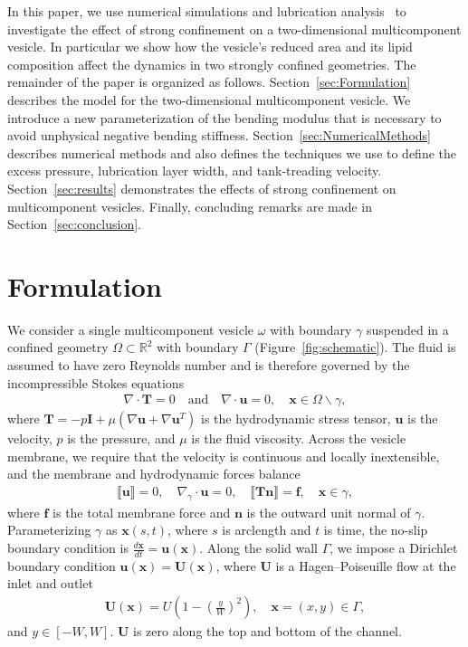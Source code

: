 \documentclass[twoside,twocolumn,9pt]{article}
\newcommand{\ff}{\mathbf{f}}
\newcommand{\nn}{\mathbf{n}}
\newcommand{\RR}{\mathbb{R}}
\newcommand{\uu}{\mathbf{u}}
\newcommand{\TT}{\mathbf{T}}
\newcommand{\UU}{\mathbf{U}}
\newcommand{\xx}{\mathbf{x}}
\begin{document}
In this paper, we use numerical simulations and lubrication
analysis~\cite{YoungStone2017_PRF,
mis-wis-ber-key-li-tun-law-per-erd-zha-zha-sun-kal-lam-kon2019} to
investigate the effect of strong confinement on a two-dimensional
multicomponent vesicle. In particular we show how the vesicle's reduced
area and its lipid composition affect the dynamics in two strongly
confined geometries.
%
The remainder of the paper is organized as follows.
Section~\ref{sec:Formulation} describes the model for the
two-dimensional multicomponent vesicle. We introduce a new
parameterization of the bending modulus that is necessary to avoid
unphysical negative bending stiffness.
Section~\ref{sec:NumericalMethods} describes numerical methods and also
defines the techniques we use to define the excess pressure, lubrication
layer width, and tank-treading velocity. Section~\ref{sec:results}
demonstrates the effects of strong confinement on multicomponent
vesicles. Finally, concluding remarks are made in
Section~\ref{sec:conclusion}.

\section{\label{sec:Formulation}Formulation}
We consider a single multicomponent vesicle $\omega$ with boundary
$\gamma$ suspended in a confined geometry $\Omega \subset \RR ^2$ with
boundary $\Gamma$ (Figure~\ref{fig:schematic}). The fluid is assumed to
have zero Reynolds number and is therefore governed by the
incompressible Stokes equations
\begin{align}
  \nabla \cdot \TT = 0 \quad \text{and} \quad \nabla \cdot \uu = 0, 
    \quad \xx \in \Omega \backslash \gamma,
\end{align}
where $\TT = -p\mathbf{I} + \mu\left(\nabla \uu + \nabla \uu^T \right)$
is the hydrodynamic stress tensor, $\uu$ is the velocity, $p$ is the
pressure, and $\mu$ is the fluid viscosity. Across the vesicle membrane,
we require that the velocity is continuous and locally inextensible, and
the membrane and hydrodynamic forces balance
\begin{align}
  \llbracket \uu \rrbracket = 0, \quad 
  \nabla_{\gamma} \cdot \uu = 0, \quad
  \llbracket \TT\nn \rrbracket = \ff, \quad \xx \in \gamma,
\end{align}
where $\ff$ is the total membrane force and $\nn$ is the outward unit
normal of $\gamma$. Parameterizing $\gamma$ as $\xx(s,t)$, where $s$ is
arclength and $t$ is time, the no-slip boundary condition is
$\frac{d\xx}{dt} = \uu(\xx)$. Along the solid wall $\Gamma$, we impose a
Dirichlet boundary condition $\uu(\xx) = \UU(\xx)$, where $\UU$ is a
Hagen–Poiseuille flow at the inlet and outlet
\begin{align}
  \UU(\xx) = U \left(1 - \left(\frac{y}{W}\right)^2 \right), 
    \quad \xx = (x,y) \in \Gamma,
  \label{eqn:dirBC}
\end{align}
and $y \in [-W,W]$. $\UU$ is zero along the top and bottom of the
channel.
\end{document}
